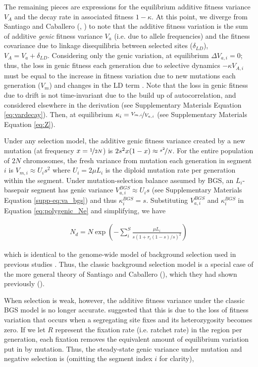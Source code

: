 \documentclass[11pt]{article}
\begin{document}
The remaining pieces are expressions for the equilibrium additive fitness
variance $V_A$ and the decay rate in associated fitness $1-\kappa$. At this
point, we diverge from Santiago and Caballero (\citeyear{Santiago1998-bs},
\citeyear{Santiago2016-mu}) to note that the additive fitness variation is the
sum of additive \emph{genic} fitness variance $V_a$ (i.e. due to allele
frequencies) and the fitness covariance due to linkage disequilibria between
selected sites ($\delta_{LD}$), $V_A = V_a + \delta_{LD}$. Considering only the
genic variation, at equilibrium $\Delta V_{a,i} = 0$; thus, the loss in genic
fitness each generation due to selective dynamics $-\kappa V_{A,i}$ must be
equal to the increase in fitness variation due to new mutations each generation
($V_m$) and changes in the LD term \parencite{Bulmer1971-ae}. Note that the
loss in genic fitness due to drift is not time-invariant due to the build up of
autocorrelation, and considered elsewhere in the derivation (see Supplementary
Materials Equation \ref{eq:vardecay}). Then, at equilibrium $\kappa_i =
\nicefrac{V_{m,i}}{V_{a,i}}$ (see Supplementary Materials Equation \ref{eq:Z}). 

Under any selection model, the additive genic fitness variance created by a new
mutation (at frequency $x=\nicefrac{1}{2N}$) is $2s^2 x(1-x) \approx
\nicefrac{s^2}{N}$. For the entire population of $2N$ chromosomes, the fresh
variance from mutation each generation in segment $i$ is $V_{m,i} \approx
U_is^2$ where $U_i = 2\mu L_i$ is the diploid mutation rate per generation
within the segment. Under mutation-selection balance assumed by BGS, an
$L_i$-basepair segment has genic variance $V_{a,i}^{BGS} \approx U_i s$ (see
Supplementary Materials Equation \ref{supp-eq:va_bgs}) and thus $\kappa_i^{BGS}
= s$. Substituting $V_{a,i}^{BGS}$ and $\kappa_i^{BGS}$ in Equation
\eqref{eq:polygenic_Ne} and simplifying, we have

\begin{align}
    N_d = N \exp \left( - \sum_i^S \frac{\mu L_i}{s(1 + r_i(1-s)/s)^2} \right) 
\end{align}

which is identical to the genome-wide model of background selection used in
previous studies \parencite{McVicker2009-ax,Elyashiv2016-vt,Murphy2022-sj}.
Thus, the classic background selection model is a special case of the more
general theory of Santiago and Caballero (\citeyear{Santiago2016-mu}), which
they had shown previously (\citeyear{Santiago1998-bs}).

When selection is weak, however, the additive fitness variance under the
classic BGS model is no longer accurate. \textcite{Santiago2016-mu} suggested
that this is due to the loss of fitness variation that occurs when a
segregating site fixes and its heterozygosity becomes zero. If we let $R$
represent the fixation rate (i.e. ratchet rate) in the region per generation,
each fixation removes the equivalent amount of equilibrium variation put in by
mutation. Thus, the steady-state genic variance under mutation and negative
selection is (omitting the segment index $i$ for clarity),
\end{document}
